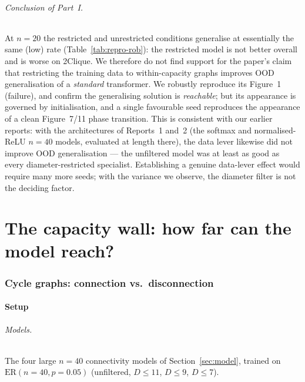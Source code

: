 \documentclass[11pt,a4paper]{article}
\begin{document}
\paragraph{Conclusion of Part~I.} At $n = 20$ the restricted and unrestricted
conditions generalise at essentially the same (low) rate
(Table~\ref{tab:repro-rob}): the restricted model is not better overall and is
worse on 2Clique. We therefore do not find support for the paper's claim that
restricting the training data to within-capacity graphs improves OOD
generalisation of a \emph{standard} transformer. We robustly reproduce its
Figure~1 (failure), and confirm the generalising solution is \emph{reachable};
but its appearance is governed by initialisation, and a single favourable seed
reproduces the appearance of a clean Figure~7/11 phase transition. This is
consistent with our earlier reports: with the architectures of Reports~1 and~2
(the softmax and normalised-ReLU $n = 40$ models, evaluated at length there), the
data lever likewise did not improve OOD generalisation --- the unfiltered model
was at least as good as every diameter-restricted specialist. Establishing a
genuine data-lever effect would require many more seeds; with the variance we
observe, the diameter filter is not the deciding factor.

\part{The capacity wall: how far can the model reach?}

\section{Cycle graphs: connection vs.\ disconnection}
\label{sec:cycles}

\subsection{Setup}

\paragraph{Models.} The four large $n = 40$ connectivity models of
Section~\ref{sec:model}, trained on $\mathrm{ER}(n = 40, p = 0.05)$
(unfiltered, $D \le 11$, $D \le 9$, $D \le 7$).
\end{document}
